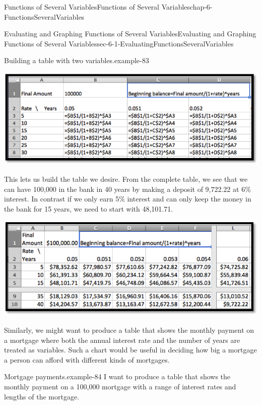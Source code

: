 \documentclass[oneside,10pt,]{book}
\numberwithin{equation}{section}
\begin{document}
\begin{chapterptx}{Functions of Several Variables}{}{Functions of Several Variables}{}{}{chap-6-FunctionsSeveralVariables}
\begin{sectionptx}{Evaluating and Graphing Functions of Several Variables}{}{Evaluating and Graphing Functions of Several Variables}{}{}{sec-6-1-EvaluatingFunctionsSeveralVariables}
\begin{example}{Building a table with two variables.}{example-83}
\begin{sidebyside}{1}{0.1}{0.1}{0}
\begin{sbspanel}{0.8}%
\includegraphics[width=1\linewidth]{images/sec-6-1-5.png}
\end{sbspanel}%
\end{sidebyside}%
\par
\hypertarget{p-2127}{}%
This lets us build the table we desire.  From the complete table, we see that we can have \textdollar{}100,000 in the bank in 40 years by making a deposit of \textdollar{}9,722.22 at 6\% interest.  In contrast if we only earn 5\% interest and can only keep the money in the bank for 15 years, we need to start with \textdollar{}48,101.71.%
\begin{sidebyside}{1}{0.15}{0.15}{0}%
\begin{sbspanel}{0.7}%
\includegraphics[width=1\linewidth]{images/sec-6-1-6.png}
\end{sbspanel}%
\end{sidebyside}%
\end{example}
\hypertarget{p-2128}{}%
Similarly, we might want to produce a table that shows the monthly payment on a mortgage where both the annual interest rate and the number of years are treated as variables.  Such a chart would be useful in deciding how big a mortgage a person can afford with different kinds of mortgages.%
\begin{example}{Mortgage payments.}{example-84}%
\hypertarget{p-2129}{}%
I want to produce a table that shows the monthly payment on a \textdollar{}100,000 mortgage with a range of interest rates and lengths of the mortgage.%
\par

\end{example}
\end{sectionptx}
\end{chapterptx}
\end{document}

